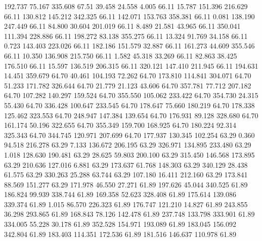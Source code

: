  192.737   75.167  335.608        67.51
  39.458   24.558    4.005        66.11
  15.787  151.396  216.629        66.11
 130.812  145.212  342.325        66.11
 142.071  153.763  358.381        66.11
   0.081  138.190  247.449        66.11
  84.800   30.604  201.019        66.11
   8.489   21.581   43.965        66.11
 350.041  111.394  228.886        66.11
 198.272   83.138  355.275        66.11
  13.324   91.769   34.158        66.11
   0.723  143.403  223.026        66.11
 182.186  151.579   32.887        66.11
 161.273   44.609  355.546        66.11
  10.350  136.908  215.750        66.11
   1.582   45.318   33.269        66.11
  82.863   38.425  176.510        66.11
  15.597  136.519  206.315        66.11
 320.121  147.410  211.945        66.11
 194.631   14.451  359.679        64.70
  40.461  104.193   72.262        64.70
 173.810  114.841  304.071        64.70
  51.233  171.782  326.644        64.70
  21.779   21.123   43.606        64.70
 357.781   77.712  207.182        64.70
 107.282  140.297  159.524        64.70
 355.550  105.062  233.422        64.70
 354.730   24.315   55.430        64.70
 336.428  100.647  233.545        64.70
 178.647   75.660  180.219        64.70
 178.338  125.462  323.553        64.70
 248.947  147.384  139.654        64.70
 176.931   89.128  328.680        64.70
 161.174   50.196  322.655        64.70
 355.349  159.700  168.925        64.70
 180.224   92.314  325.343        64.70
 344.745  120.971  207.699        64.70
 177.937  130.345  102.254        63.29
   0.360   94.518  216.278        63.29
   7.133  136.672  206.195        63.29
 326.971  134.895  233.480        63.29
   1.018  128.630  190.481        63.29
  28.625   59.803  200.100        63.29
 315.450  146.568  173.895        63.29
 210.636  127.016    6.881        63.29
 173.637   61.768  148.303        63.29
 340.129   28.438   61.575        63.29
 330.263   25.288   63.744        63.29
 107.180   16.411  212.160        63.29
 173.841   88.569  151.277        63.29
 171.978   46.550   27.271        61.89
 197.626   45.044  340.525        61.89
 186.824   99.939  338.744        61.89
 169.358   52.623  328.408        61.89
 175.614  139.086  339.374        61.89
   1.015   86.570  226.323        61.89
 176.747  121.210   14.827        61.89
 243.855   36.298  293.865        61.89
 168.843   78.126  142.478        61.89
 237.748  133.798  333.901        61.89
 334.005   55.228   30.178        61.89
 352.528  154.971  193.089        61.89
 183.045  156.092  342.804        61.89
 183.403  114.351  172.536        61.89
 181.516  146.637  110.978        61.89
